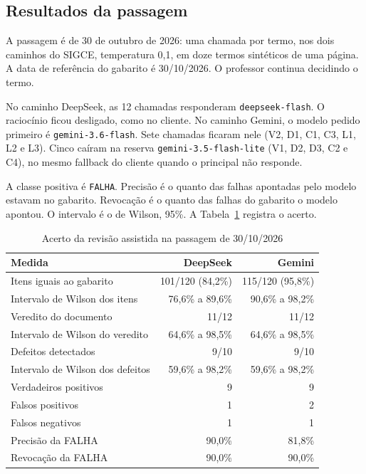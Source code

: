\subsection{Resultados da passagem}

A passagem é de 30 de outubro de 2026: uma chamada por termo, nos dois caminhos do SIGCE, temperatura 0,1, em doze termos sintéticos de uma página. A data de referência do gabarito é 30/10/2026. O professor continua decidindo o termo.

No caminho DeepSeek, as 12 chamadas responderam \texttt{deepseek-flash}. O raciocínio ficou desligado, como no cliente. No caminho Gemini, o modelo pedido primeiro é \texttt{gemini-3.6-flash}. Sete chamadas ficaram nele (V2, D1, C1, C3, L1, L2 e L3). Cinco caíram na reserva \texttt{gemini-3.5-flash-lite} (V1, D2, D3, C2 e C4), no mesmo fallback do cliente quando o principal não responde.

A classe positiva é \texttt{FALHA}. Precisão é o quanto das falhas apontadas pelo modelo estavam no gabarito. Revocação é o quanto das falhas do gabarito o modelo apontou. O intervalo é o de Wilson, 95\%. A Tabela~\ref{tab:acerto-revisao-tce} registra o acerto.

\begin{table}[H]
\centering
\caption{Acerto da revisão assistida na passagem de 30/10/2026}
\label{tab:acerto-revisao-tce}
\begin{tabular}{|l|r|r|}
\hline
\textbf{Medida} & \textbf{DeepSeek} & \textbf{Gemini} \\
\hline
Itens iguais ao gabarito & 101/120 (84,2\%) & 115/120 (95,8\%) \\
\hline
Intervalo de Wilson dos itens & 76,6\% a 89,6\% & 90,6\% a 98,2\% \\
\hline
Veredito do documento & 11/12 & 11/12 \\
\hline
Intervalo de Wilson do veredito & 64,6\% a 98,5\% & 64,6\% a 98,5\% \\
\hline
Defeitos detectados & 9/10 & 9/10 \\
\hline
Intervalo de Wilson dos defeitos & 59,6\% a 98,2\% & 59,6\% a 98,2\% \\
\hline
Verdadeiros positivos & 9 & 9 \\
\hline
Falsos positivos & 1 & 2 \\
\hline
Falsos negativos & 1 & 1 \\
\hline
Precisão da FALHA & 90,0\% & 81,8\% \\
\hline
Revocação da FALHA & 90,0\% & 90,0\% \\
\hline
\end{tabular}
\end{table}

